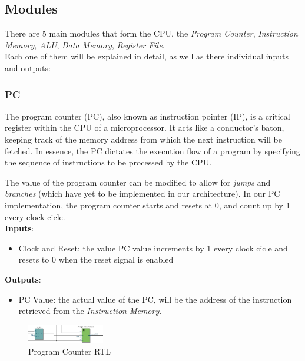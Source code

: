 \documentclass[9pt,a4paper,twoside]{tau}
\begin{document}
\subsection{Modules}
There are 5 main modules that form the CPU, the \textit{Program Counter}, \textit{Instruction Memory}, \textit{ALU}, \textit{Data Memory}, \textit{Register File}.\\ Each one of them will be explained in detail, as well as there individual inputs and outputs:

\subsubsection{PC}
    The program counter (PC), also known as instruction pointer (IP), is a critical register within the CPU of a microprocessor. It acts like a conductor's baton, keeping track of the memory address from which the next instruction will be fetched. In essence, the PC dictates the execution flow of a program by specifying the sequence of instructions to be processed by the CPU.

    The value of the program counter can be modified to allow for \textit{jumps} and \textit{branches} (which have yet to be implemented in our architecture). In our PC implementation, the program counter starts and resets at 0, and count up by 1 every clock cicle.\\
    
    \textbf{Inputs}:
    \begin{itemize}
        \item Clock and Reset: the value PC value increments by 1 every clock cicle and resets to 0 when the reset signal is enabled 
    \end{itemize}
    \textbf{Outputs}:
    \begin{itemize}
        \item PC Value: the actual value of the PC, will be the address of the instruction retrieved from the \textit{Instruction Memory}.
    \end{itemize}
    
    \begin{figure}[h]  %
        \centering  %
        \includegraphics[width=0.3\textwidth]{images/PCImg.png}
        \caption{Program Counter RTL}
        \label{fig:Counter RTL}
    \end{figure}
\end{document}
